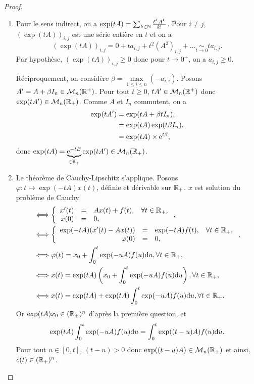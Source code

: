 \documentclass[12pt]{article}
\begin{document}
\begin{proof}
	\phantom{}
	\begin{enumerate}
		\item Pour le sens indirect, on a $\exp(tA)=\sum_{k\in\mathbb{N}}\frac{t^{k}A^{k}}{k!}$. Pour $i\neq j$, $(\exp(tA))_{i,j}$ est une série entière en $t$ et on a 
		\begin{equation*}
			(\exp(tA))_{i,j}=0+t a_{i,j}+t^{2}(A^{2})_{i,j}+\dots\underset{t\to0}{\sim}t a_{i,j}.
		\end{equation*}
		Par hypothèse, $(\exp(tA))_{i,j}\geqslant 0$ donc pour $t\to0^{+}$, on a $a_{i,j}\geqslant0$.
		
		Réciproquement, on considère $\beta=\max\limits_{1\leqslant i\leqslant n}(-a_{i,i})$. Posons $A'=A+\beta I_n\in\mathcal{M}_n(\mathbb{R}^{+})$. Pour tout $t\geqslant 0$, $tA'\in\mathcal{M}_n(\mathbb{R}^{+})$ donc $\exp(tA')\in\mathcal{M}_n(\mathbb{R}_{+})$. Comme $A$ et $I_n$ commutent, on a 
		\begin{align*}
			\exp(tA')
			&=\exp(tA+\beta tI_n),\\
			&=\exp(tA)\exp(t\beta I_n),\\
			&=\exp(tA)\times\mathrm{e}^{t\beta},
		\end{align*}
		donc $\exp(tA)=\underbrace{\mathrm{e}^{-t B}}_{\in\mathbb{R}_{+}}\exp(tA')\in\mathcal{M}_n(\mathbb{R}_{+})$.

		\item Le théorème de Cauchy-Lipschitz s'applique. Posons $\varphi\colon t\mapsto\exp(-t A)x(t)$, définie et dérivable sur $\mathbb{R}_{+}$. $x$ est solution du problème de Cauchy
		\begin{align*}
			&\Longleftrightarrow 
			\left\lbrace
				\begin{array}[]{rcll}
					x'(t)&=&A x(t)+f(t), &\forall t\in\R_{+},\\
					x(0)&=&0,
				\end{array}
			\right.,\\
			&\Longleftrightarrow 
			\left\lbrace
				\begin{array}[]{rcll}
					\exp(-tA)(x'(t)-Ax(t))&=&\exp(-tA)f(t), &\forall t\in\R_{+},\\
					\varphi(0)&=&0,
				\end{array}
			\right.,\\
			&\Longleftrightarrow 
			\varphi(t)=x_0+\int_{0}^{t}\exp(-u A)f(u)\d u,\forall t\in\R_{+},\\
			&\Longleftrightarrow 
			x(t)=\exp(tA)\left(x_0+\int_{0}^{t}\exp(-u A)f(u)\d u\right),\forall t\in\R_{+},\\
			&\Longleftrightarrow 
			x(t)=\exp(tA)+\exp(tA)\int_{0}^{t}\exp(-u A)f(u)\d u,\forall t\in\R_{+}.
		\end{align*}
		Or $\exp(t A)x_0\in(\mathbb{R}_{+})^{n}$ d'après la première question, et 
		\begin{equation*}
			\exp(tA)\int_{0}^{t}\exp(-u A)f(u)\mathrm{d} u=\int_{0}^{t}\exp((t-u)A)f(u)\mathrm{d} u.
		\end{equation*}
		Pour tout $u\in[0,t]$, $(t-u)>0$ donc $\exp((t-u)A)\in\mathcal{M}_n(\mathbb{R}_{+})$ et ainsi, $c(t)\in(\mathbb{R}_{+})^{n}$.
	\end{enumerate}
\end{proof}
\end{document}
